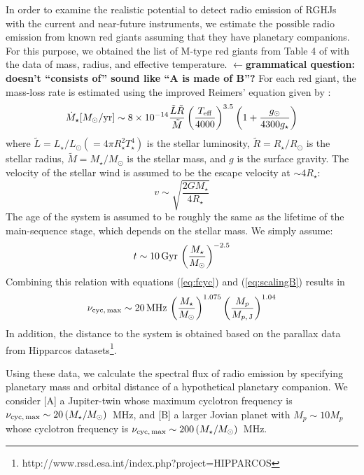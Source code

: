 \documentclass[iop,numberedappendix,apj,twocolappendix,]{emulateapj}
\def\revise#1{\color{blue}{\bf #1} \color{black}}
\def\memoYF#1{\color{red}$\leftarrow${\bf #1} \color{black}}
\begin{document}
In order to examine the realistic potential to detect radio emission of RGHJs with the current and near-future instruments, we estimate the possible radio emission from known red giants assuming that they have planetary companions. 
For this purpose, we obtained the list of M-type red giants from Table 4 of \citet{dumm1998} with the data of mass, radius, and effective temperature. 
\revise{We note that their data do not unambiguously distinguish RG from early AGB stars and thus the list likely consists of about 40\% early AGB stars. }\memoYF{grammatical question: doesn't ``consists of'' sound like ``A is made of B''?}
For each red giant, the mass-loss rate is estimated using the improved Reimers' equation \citep{reimers1975} given by \citet{schroder2005,schroder2007}:
\begin{equation}
\dot M_\star [M_\odot{\rm /yr}] \sim 8 \times 10^{-14} \frac{\tilde L \tilde R}{\tilde M} \left( \frac{T_{\rm eff}}{4000} \right)^{3.5} \left( 1 + \frac{g_{\odot }}{4300 g_{\star}} \right) \label{eq:mass-loss}
\end{equation}
where $\tilde L = L_{\star }/L_{\odot }(=4\pi R_{\star }^2 T_{\star }^4)$ is the stellar luminosity, $\tilde R = R_{\star }/R_{\odot }$ is the stellar radius, $\tilde M = M_{\star }/M_{\odot }$ is the stellar mass, and $g$ is the surface gravity. 
The velocity of the stellar wind is assumed to be the escape velocity at $\sim 4 R_{\star }$:
\begin{equation}
v \sim \sqrt{\frac{2GM_\star}{4R_{\star }}}
\end{equation}
The age of the system is assumed to be roughly the same as the lifetime of the main-sequence stage, which depends on the stellar mass. We simply assume:
\begin{equation}
t \sim 10\,{\rm Gyr}\, \left( \frac{M_{\star}}{M_{\odot }} \right)^{-2.5}
\end{equation}
Combining this relation with equations (\ref{eq:fcyc}) and (\ref{eq:scalingB}) results in
\begin{equation}
\nu_{\rm cyc,\,max} \sim 20 \,{\rm MHz}\, \left( \frac{M_{\star}}{M_{\odot }} \right)^{1.075} \left( \frac{M_p}{M_{p,\,{\rm J}}} \right)^{1.04} 
\end{equation}
In addition, the distance to the system is obtained based on the parallax data from Hipparcos datasets\footnote{http://www.rssd.esa.int/index.php?project=HIPPARCOS}.

Using these data, we calculate the spectral flux of radio emission by specifying planetary mass and orbital distance of a hypothetical planetary companion. 
We consider [A] a Jupiter-twin whose maximum cyclotron frequency is $\nu _{\rm cyc,\,max} \sim 20\,(M_{\star }/M_{\odot})$~MHz, and [B] a larger Jovian planet with $M_p\sim 10M_p$ whose cyclotron frequency is $\nu _{\rm cyc,\,max} \sim 200\,(M_{\star }/M_{\odot})$~MHz. 
\end{document}
